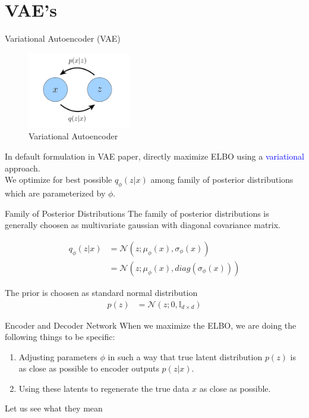 \section*{VAE's}
\begin{frame}{Variational Autoencoder (VAE)}
    \begin{figure}
        \centering
        \includegraphics[width=0.4\textwidth]{Images/vae1.png}
        \caption{Variational Autoencoder}
    \end{figure}

    In default formulation in VAE paper, directly maximize ELBO using a \textcolor{blue}{variational} approach. \\

    We optimize for best possible $q_{\phi}(z|x)$ among family of posterior distributions which are parameterized by $\phi$.

\end{frame} 

\begin{frame}{Family of Posterior Distributions}
    The family of posterior distributions is generally choosen as multivariate gaussian with diagonal covariance matrix.

    \begin{align*}
        q_{\phi}(z|x) &= \mathcal{N}(z ; \mu_{\phi}(x), \sigma_{\phi}(x)) \\
        &= \mathcal{N}(z;\mu_{\phi}(x), diag(\sigma_{\phi}(x)))
    \end{align*}

    The prior is choosen as standard normal distribution 
    \begin{align*}
        p(z) &= \mathcal{N}(z;0, \mathbb{I}_{d \times d})
    \end{align*}
\end{frame}

\begin{frame}{Encoder and Decoder Network}
    When we maximize the ELBO, we are doing the following things to be specific:
    \begin{enumerate}
        \item Adjusting parameters $\phi$ in such a way that true latent distribution $p(z)$ is as close as possible to encoder outputs $p(z|x)$.
        \item Using these latents to regenerate the true data $x$ as close as possible.
    \end{enumerate}

    Let us see what they mean
\end{frame}

